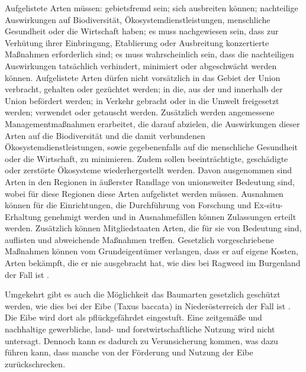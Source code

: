 \documentclass[twocolumn]{scrartcl}
\begin{document}
Aufgelistete
Arten müssen: gebietsfremd sein; sich ausbreiten können; nachteilige
Auswirkungen auf Biodiversität, Ökosystemdienstleistungen, menschliche
Gesundheit oder die Wirtschaft haben; es muss nachgewiesen sein, dass zur
Verhütung ihrer Einbringung, Etablierung oder Ausbreitung konzertierte Maßnahmen
erforderlich sind; es muss wahrscheinlich sein, dass die nachteiligen
Auswirkungen tatsächlich verhindert, minimiert oder abgeschwächt werden können.
Aufgelistete Arten dürfen nicht vorsätzlich in das Gebiet der Union verbracht,
gehalten oder gezüchtet werden; in die, aus der und innerhalb der Union
befördert werden; in Verkehr gebracht oder in die Umwelt freigesetzt werden;
verwendet oder getauscht werden. Zusätzlich werden angemessene
Managementmaßnahmen erarbeitet, die darauf abzielen, die Auswirkungen dieser
Arten auf die Biodiversität und die damit verbundenen Ökosystemdienstleistungen,
sowie gegebenenfalls auf die menschliche Gesundheit oder die Wirtschaft, zu
minimieren. Zudem sollen beeinträchtigte, geschädigte oder zerstörte Ökosysteme
wiederhergestellt werden. Davon ausgenommen sind Arten in den Regionen in
äußerster Randlage von unionsweiter Bedeutung sind, wobei für diese Regionen
diese Arten aufgelistet werden müssen. Ausnahmen können für die Einrichtungen,
die Durchführung von Forschung und Ex-situ-Erhaltung genehmigt werden und in
Ausnahmefällen können Zulassungen erteilt werden. Zusätzlich können
Mitgliedstaaten Arten, die für sie von Bedeutung sind, auflisten und abweichende
Maßnahmen treffen. Gesetzlich vorgeschriebene Maßnahmen können vom
Grundeigentümer verlangen, dass er auf eigene Kosten, Arten bekämpft, die er
nie ausgebracht hat, wie dies bei Ragweed im Burgenland der Fall ist
\citep{burgenland2021ragweed}.

Umgekehrt gibt es auch die Möglichkeit das Baumarten gesetzlich geschützt
werden, wie dies bei der Eibe (Taxus baccata) in Niederösterreich der Fall ist
\citep{niederoesterreich2000Naturschutzgesetz,niederoesterreich2005artenschutzverordnung}.
Die Eibe wird dort als pflückgefährdet eingestuft. Eine zeitgemäße und
nachhaltige gewerbliche, land- und forstwirtschaftliche Nutzung wird nicht
untersagt. Dennoch kann es dadurch zu Verunsicherung kommen, was dazu führen
kann, dass manche von der Förderung und Nutzung der Eibe zurückschrecken.
\end{document}
